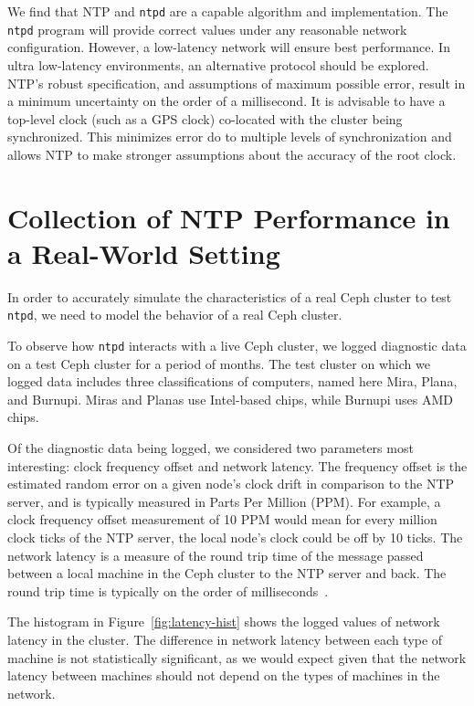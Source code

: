 We find that NTP and \texttt{ntpd} are a capable algorithm and
implementation.  The \texttt{ntpd} program will provide correct values
under any reasonable network configuration. However, a low-latency
network will ensure best performance. In ultra low-latency
environments, an alternative protocol should be explored. NTP's robust
specification, and assumptions of maximum possible error, result in a
minimum uncertainty on the order of a millisecond.  It is advisable to
have a top-level clock (such as a GPS clock) co-located with the
cluster being synchronized. This minimizes error do to multiple levels
of synchronization and allows NTP to make stronger assumptions about
the accuracy of the root clock.



\section{Collection of NTP Performance in a Real-World Setting}

In order to accurately simulate the characteristics of a real Ceph
cluster to test \texttt{ntpd}, we need to model the behavior of a real
Ceph cluster.

To observe how \texttt{ntpd} interacts with a live Ceph cluster, we
logged diagnostic data on a test Ceph cluster for a period of months.
The test cluster on which we logged data includes three
classifications of computers, named here Mira, Plana, and
Burnupi. Miras and Planas use Intel-based chips, while Burnupi uses
AMD chips.

Of the diagnostic data being logged, we considered two parameters most
interesting: clock frequency offset and network latency.  The
frequency offset is the estimated random error on a given node's clock
drift in comparison to the NTP server, and is typically measured in
Parts Per Million (PPM). For example, a clock frequency offset
measurement of 10 PPM would mean for every million clock ticks of the
NTP server, the local
node's clock could be off by 10 ticks. The network latency is a
measure of the round trip time of the message passed between a local
machine in the Ceph cluster to the NTP server and back. The round trip
time is typically on the order of milliseconds~\citep{Sage}.

The histogram in Figure~\ref{fig:latency-hist} shows the logged values
of network latency in the cluster. The difference in network latency
between each type of machine is not statistically significant, as we
would expect given that the network latency between machines should
not depend on the types of machines in the network.

